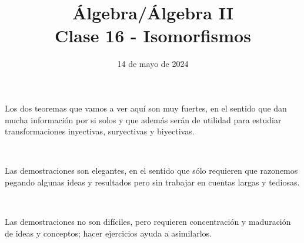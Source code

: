 \documentclass[handout]{beamer} %
\title[Clase 16 - Isomorfismos]{Álgebra/Álgebra II \\ Clase 16 - Isomorfismos}
\author[]{}
\institute[]{\normalsize FAMAF / UNC
	\\[\baselineskip] ${}^{}$
	\\[\baselineskip]
}
\date[14/05/20204]{14 de mayo de 2024}
\newcommand{\im}{\operatorname{Im}}
\renewcommand\nu{\operatorname{Nu}}
\begin{document}
\begin{frame}
\maketitle
\end{frame}




\begin{frame}
Los dos teoremas que vamos a ver aquí son muy fuertes, en el sentido que dan mucha información por si solos y que además serán de utilidad para estudiar transformaciones inyectivas, suryectivas y biyectivas.
\pause

\

Las demostraciones son elegantes, en el sentido que sólo requieren que razonemos pegando algunas ideas y resultados pero sin trabajar en cuentas largas y tediosas.
\pause

\

Las demostraciones no son difíciles, pero requieren concentración y maduración de ideas y conceptos; hacer ejercicios ayuda a asimilarlos.
\pause
\


\end{frame}


\end{document}
